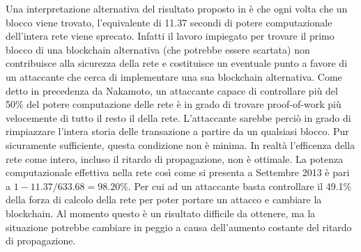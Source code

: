 Una interpretazione alternativa del risultato proposto in %
è che ogni volta che un blocco viene trovato, l'equivalente di 11.37 secondi di potere computazionale dell'intera rete viene sprecato. Infatti il lavoro impiegato per trovare il primo blocco di una blockchain alternativa (che potrebbe essere scartata) non contribuisce alla sicurezza della rete e costituisce un eventuale punto a favore di un attaccante che cerca di implementare una sua blockchain alternativa. Come detto in precedenza da Nakamoto, un attaccante capace di controllare più del 50\% del potere computazione delle rete è in grado di trovare proof-of-work più velocemente di tutto il resto il della rete. L'attaccante sarebbe perciò in grado di rimpiazzare l'intera storia delle transazione a partire da un qualsiasi blocco. Pur sicuramente sufficiente, questa condizione non è minima. In realtà l'efficenza della rete come intero, incluso il ritardo di propagazione, non è ottimale. La potenza computazionale effettiva nella rete così come si presenta a Settembre 2013 è pari a $1 - 11.37 / 633.68 = 98.20\%$. Per cui ad un attaccante basta controllare il 49.1\% della forza di calcolo della rete per poter portare un attacco e cambiare la blockchain. Al momento questo è un risultato difficile da ottenere, ma la situazione potrebbe cambiare in peggio a causa dell'aumento costante del ritardo di propagazione.
